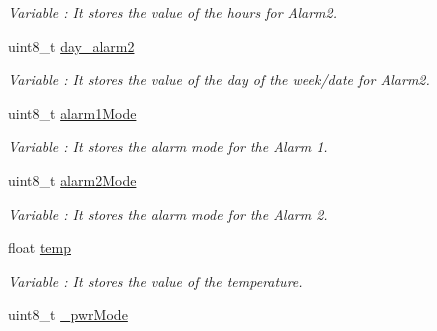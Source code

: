 \begin{DoxyCompactItemize}
\begin{DoxyCompactList}\small\item\em Variable \+: It stores the value of the hours for Alarm2. \end{DoxyCompactList}\item 
uint8\+\_\+t \hyperlink{class_wasp_r_t_c_a0cb80e69826e590662b6230787a65a06}{day\+\_\+alarm2}\hypertarget{class_wasp_r_t_c_a0cb80e69826e590662b6230787a65a06}{}\label{class_wasp_r_t_c_a0cb80e69826e590662b6230787a65a06}

\begin{DoxyCompactList}\small\item\em Variable \+: It stores the value of the day of the week/date for Alarm2. \end{DoxyCompactList}\item 
uint8\+\_\+t \hyperlink{class_wasp_r_t_c_a0b3db37ecd9abe1bc6ca0bd42d86164b}{alarm1\+Mode}\hypertarget{class_wasp_r_t_c_a0b3db37ecd9abe1bc6ca0bd42d86164b}{}\label{class_wasp_r_t_c_a0b3db37ecd9abe1bc6ca0bd42d86164b}

\begin{DoxyCompactList}\small\item\em Variable \+: It stores the alarm mode for the Alarm 1. \end{DoxyCompactList}\item 
uint8\+\_\+t \hyperlink{class_wasp_r_t_c_a8e32cf02895268c5627a8533d0ba2402}{alarm2\+Mode}\hypertarget{class_wasp_r_t_c_a8e32cf02895268c5627a8533d0ba2402}{}\label{class_wasp_r_t_c_a8e32cf02895268c5627a8533d0ba2402}

\begin{DoxyCompactList}\small\item\em Variable \+: It stores the alarm mode for the Alarm 2. \end{DoxyCompactList}\item 
float \hyperlink{class_wasp_r_t_c_aa3c98dea66301379bb928a7dbbebc454}{temp}\hypertarget{class_wasp_r_t_c_aa3c98dea66301379bb928a7dbbebc454}{}\label{class_wasp_r_t_c_aa3c98dea66301379bb928a7dbbebc454}

\begin{DoxyCompactList}\small\item\em Variable \+: It stores the value of the temperature. \end{DoxyCompactList}\item 
uint8\+\_\+t \hyperlink{class_wasp_r_t_c_af05bbd464ba747016043d54c275aca7e}{\+\_\+pwr\+Mode}\hypertarget{class_wasp_r_t_c_af05bbd464ba747016043d54c275aca7e}{}\label{class_wasp_r_t_c_af05bbd464ba747016043d54c275aca7e}


\end{DoxyCompactItemize}
